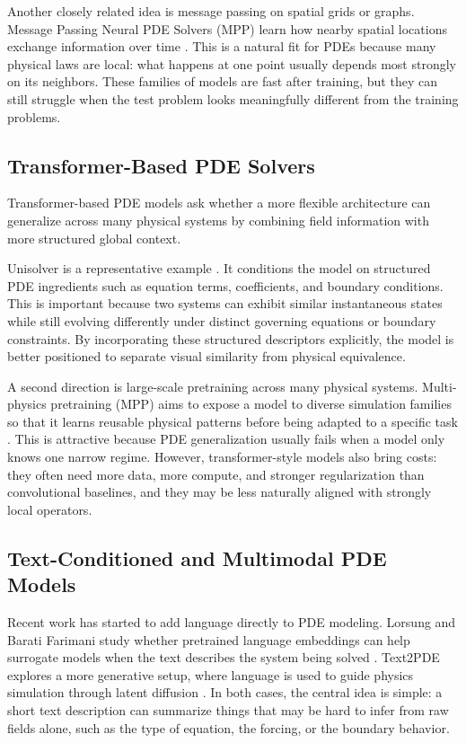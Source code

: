 \documentclass[
]{article}
\begin{document}
Another closely related idea is message passing on spatial grids or
graphs. Message Passing Neural PDE Solvers (MPP) learn how nearby
spatial locations exchange information over time \citep{mpp}. This is a
natural fit for PDEs because many physical laws are local: what happens
at one point usually depends most strongly on its neighbors. These
families of models are fast after training, but they can still struggle
when the test problem looks meaningfully different from the training
problems.

\subsection{Transformer-Based PDE
Solvers}\label{transformer-based-pde-solvers}

Transformer-based PDE models ask whether a more flexible architecture
can generalize across many physical systems by combining field
information with more structured global context.

Unisolver is a representative example \citep{unisolver}. It conditions
the model on structured PDE ingredients such as equation terms,
coefficients, and boundary conditions. This is important because two
systems can exhibit similar instantaneous states while still evolving
differently under distinct governing equations or boundary constraints.
By incorporating these structured descriptors explicitly, the model is
better positioned to separate visual similarity from physical
equivalence.

A second direction is large-scale pretraining across many physical
systems. Multi-physics pretraining (MPP) aims to expose a model to
diverse simulation families so that it learns reusable physical patterns
before being adapted to a specific task \citep{mpp}. This is attractive
because PDE generalization usually fails when a model only knows one
narrow regime. However, transformer-style models also bring costs: they
often need more data, more compute, and stronger regularization than
convolutional baselines, and they may be less naturally aligned with
strongly local operators.

\subsection{Text-Conditioned and Multimodal PDE
Models}\label{text-conditioned-and-multimodal-pde-models}

Recent work has started to add language directly to PDE modeling.
Lorsung and Barati Farimani study whether pretrained language embeddings
can help surrogate models when the text describes the system being
solved \citep{lorsung2024}. Text2PDE explores a more generative setup,
where language is used to guide physics simulation through latent
diffusion \citep{text2pde}. In both cases, the central idea is simple: a
short text description can summarize things that may be hard to infer
from raw fields alone, such as the type of equation, the forcing, or the
boundary behavior.
\end{document}
